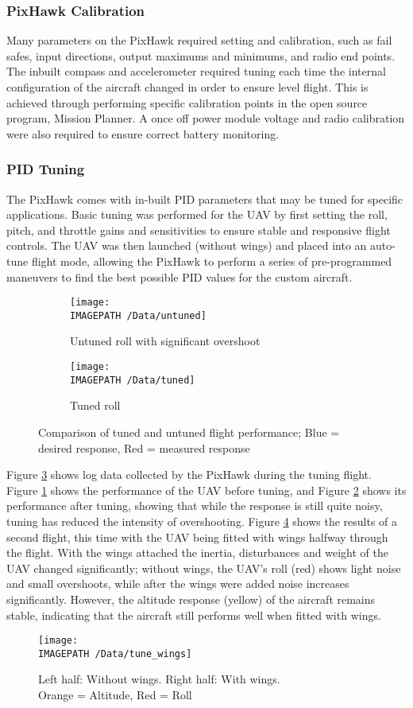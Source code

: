 \subsubsection*{PixHawk Calibration}
Many parameters on the PixHawk required setting and calibration, such as fail safes, input directions, output maximums and minimums, and radio end points. The inbuilt compass and accelerometer required tuning each time the internal configuration of the aircraft changed in order to ensure level flight. This is achieved through performing specific calibration points in the open source program, Mission Planner. A once off power module voltage and radio calibration were also required to ensure correct battery monitoring. 


\subsubsection*{PID Tuning}
The PixHawk comes with in-built PID parameters that may be tuned for specific applications. Basic tuning was performed for the UAV by first setting the roll, pitch, and throttle gains and sensitivities to ensure stable and responsive flight controls. The UAV was then launched (without wings) and placed into an auto-tune flight mode, allowing the PixHawk to perform a series of pre-programmed maneuvers to find the best possible PID values for the custom aircraft.\\

\begin{figure}[!ht]
	\centering
	\begin{subfigure}{.5\textwidth}
		\texttt{[image: \\IMAGEPATH /Data/untuned]}
		\caption{Untuned roll with significant overshoot}
		\label{fig:untunedroll}
	\end{subfigure}%
	\begin{subfigure}{.5\textwidth}
		\centering
		\texttt{[image: \\IMAGEPATH /Data/tuned]}
		\caption{Tuned roll}
		\label{fig:tunedroll}
	\end{subfigure}
	\caption{Comparison of tuned and untuned flight performance; Blue = desired response, Red = measured response}
	\label{fig:tune1}
\end{figure}

Figure \ref{fig:tune1} shows log data collected by the PixHawk during the tuning flight. Figure \ref{fig:untunedroll} shows the performance of the UAV before tuning, and Figure \ref{fig:tunedroll} shows its performance after tuning, showing that while the response is still quite noisy, tuning has reduced the intensity of overshooting. Figure \ref{fig:tune2} shows the results of a second flight, this time with the UAV being fitted with wings halfway through the flight. With the wings attached the inertia, disturbances and weight of the UAV changed significantly; without wings, the UAV's roll (red) shows light noise and small overshoots, while after the wings were added noise increases significantly. However, the altitude response (yellow) of the aircraft remains stable, indicating that the aircraft still performs well when fitted with wings.

\begin{figure}[!ht]
	\centering
	\texttt{[image: \\IMAGEPATH /Data/tune\_wings]}
	\caption{Left half: Without wings. Right half: With wings.\\ Orange = Altitude, Red = Roll}
	\label{fig:tune2}
\end{figure}